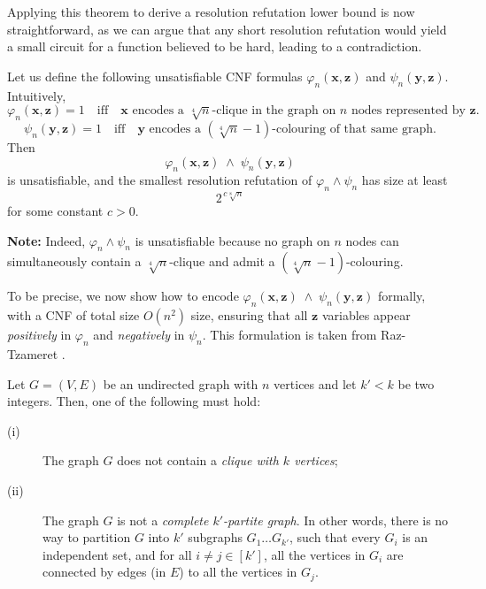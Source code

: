 Applying this theorem to derive a resolution refutation lower bound is now straightforward, as we can argue that any short resolution refutation would yield a small circuit for a function believed to be hard, leading to a contradiction.

\begin{theorem}\label{thm:interpolation-lower-bound}
Let us define the following unsatisfiable CNF formulas \(\varphi_n(\mathbf{x},\mathbf{z})\) and \(\psi_n(\mathbf{y},\mathbf{z})\). Intuitively,
\[
\varphi_n(\mathbf{x},\mathbf{z}) = 1 \quad\text{iff}\quad \mathbf{x} \text{ encodes a }\sqrt[4]{n}\text{-clique in the graph on }n\text{ nodes represented by }\mathbf{z}.
\]
\[
\psi_n(\mathbf{y},\mathbf{z}) = 1 \quad\text{iff}\quad \mathbf{y} \text{ encodes a }(\sqrt[4]{n}-1)\text{-colouring of that same graph.}
\]
Then 
\[
\varphi_n(\mathbf{x},\mathbf{z}) \;\wedge\; \psi_n(\mathbf{y},\mathbf{z})
\]
is unsatisfiable, and the smallest resolution refutation of \(\varphi_n \wedge \psi_n\) has size at least
\[
2^{\,c\sqrt[8]{n}}
\]
for some constant \(c>0\).
\end{theorem}

\medskip
\noindent
\textbf{Note:} Indeed, \(\varphi_n \wedge \psi_n\) is unsatisfiable because no graph on \(n\) nodes can simultaneously contain a \(\sqrt[4]{n}\)-clique and admit a \((\sqrt[4]{n}-1)\)-colouring.

\medskip

To be precise, we now show how to encode 
$ \varphi_n(\mathbf{x},\mathbf{z}) \;\wedge\; \psi_n(\mathbf{y},\mathbf{z})$ formally, with a CNF of total size \(O(n^2)\) size, ensuring that all \(\mathbf{z}\) variables appear \emph{positively} in \(\varphi_n\) and \emph{negatively} in \(\psi_n\).
This formulation is taken from Raz-Tzameret \cite{RT07}. 




Let $G=(V,E)$ be an undirected graph with $n$ vertices and let $k'<k$ be
two integers.
Then, one of the following must hold:
\begin{description}
\item[(i)] The graph $G$ does not contain a \emph{clique with $k$ vertices};

\item[(ii)] The graph $G$ is not a \emph{complete $k'$-partite graph}.
In other words, there is no way to partition $G$ into $k'$ subgraphs
$G_1\dots G_{k'}$,
such that every $G_i$ is an independent set, and for all $i\ne j \in[k']$,
all the vertices in $G_i$ are connected by edges (in $E$) to all the vertices in $G_j$.
\end{description}

